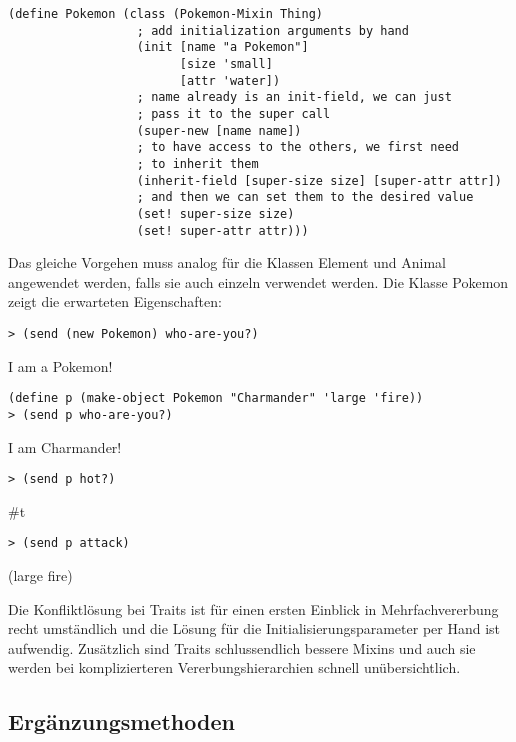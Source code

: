 \begin{lstlisting}
(define Pokemon (class (Pokemon-Mixin Thing)
                  ; add initialization arguments by hand
                  (init [name "a Pokemon"]
                        [size 'small]
                        [attr 'water])
                  ; name already is an init-field, we can just
                  ; pass it to the super call
                  (super-new [name name])
                  ; to have access to the others, we first need
                  ; to inherit them
                  (inherit-field [super-size size] [super-attr attr])
                  ; and then we can set them to the desired value
                  (set! super-size size)
                  (set! super-attr attr)))
\end{lstlisting}

Das gleiche Vorgehen muss analog für die Klassen Element und Animal angewendet werden, falls sie auch einzeln verwendet werden. Die Klasse Pokemon zeigt die erwarteten Eigenschaften:

\begin{lstlisting}
> (send (new Pokemon) who-are-you?)
\end{lstlisting}
{\routput {\qq}I am a Pokemon!\qq}

\begin{lstlisting}
(define p (make-object Pokemon "Charmander" 'large 'fire))
> (send p who-are-you?)
\end{lstlisting}
{\routput {\qq}I am Charmander!\qq}

\begin{lstlisting}
> (send p hot?)
\end{lstlisting}
{\routput \#t}

\begin{lstlisting}
> (send p attack)
\end{lstlisting}
{\rsymbol (large fire)}

Die Konfliktlösung bei Traits ist für einen ersten Einblick in Mehrfachvererbung recht umständlich und die Lösung für die Initialisierungsparameter per Hand ist aufwendig. Zusätzlich sind Traits schlussendlich bessere Mixins und auch sie werden bei komplizierteren Vererbungshierarchien schnell unübersichtlich.

\subsection{Ergänzungsmethoden} \vspace{-0.2cm}

